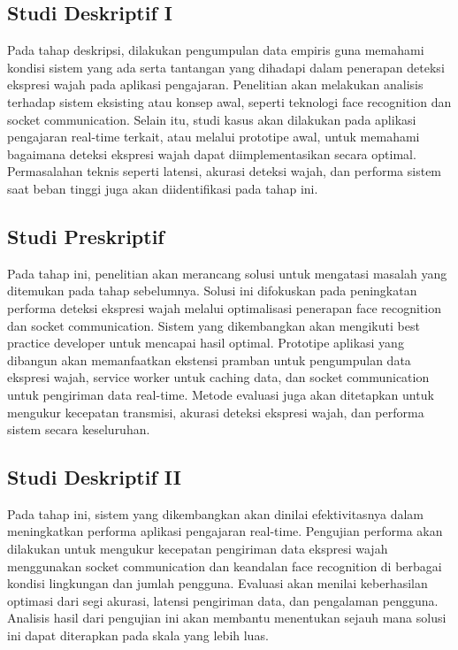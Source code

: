 \subsection{Studi Deskriptif I}
Pada tahap deskripsi, dilakukan pengumpulan data empiris guna memahami kondisi sistem yang ada serta tantangan yang dihadapi dalam penerapan deteksi ekspresi wajah pada aplikasi pengajaran.
Penelitian akan melakukan analisis terhadap sistem eksisting atau konsep awal, seperti teknologi face recognition dan socket communication.
Selain itu, studi kasus akan dilakukan pada aplikasi pengajaran real-time terkait, atau melalui prototipe awal, untuk memahami bagaimana deteksi ekspresi wajah dapat diimplementasikan secara optimal.
Permasalahan teknis seperti latensi, akurasi deteksi wajah, dan performa sistem saat beban tinggi juga akan diidentifikasi pada tahap ini.

\subsection{Studi Preskriptif}
Pada tahap ini, penelitian akan merancang solusi untuk mengatasi masalah yang ditemukan pada tahap sebelumnya.
Solusi ini difokuskan pada peningkatan performa deteksi ekspresi wajah melalui optimalisasi penerapan face recognition dan socket communication.
Sistem yang dikembangkan akan mengikuti best practice developer untuk mencapai hasil optimal.
Prototipe aplikasi yang dibangun akan memanfaatkan ekstensi pramban untuk pengumpulan data ekspresi wajah, service worker untuk caching data, dan socket communication untuk pengiriman data real-time.
Metode evaluasi juga akan ditetapkan untuk mengukur kecepatan transmisi, akurasi deteksi ekspresi wajah, dan performa sistem secara keseluruhan.

\subsection{Studi Deskriptif II}
Pada tahap ini, sistem yang dikembangkan akan dinilai efektivitasnya dalam meningkatkan performa aplikasi pengajaran real-time.
Pengujian performa akan dilakukan untuk mengukur kecepatan pengiriman data ekspresi wajah menggunakan socket communication dan keandalan face recognition di berbagai kondisi lingkungan dan jumlah pengguna.
Evaluasi akan menilai keberhasilan optimasi dari segi akurasi, latensi pengiriman data, dan pengalaman pengguna.
Analisis hasil dari pengujian ini akan membantu menentukan sejauh mana solusi ini dapat diterapkan pada skala yang lebih luas.


